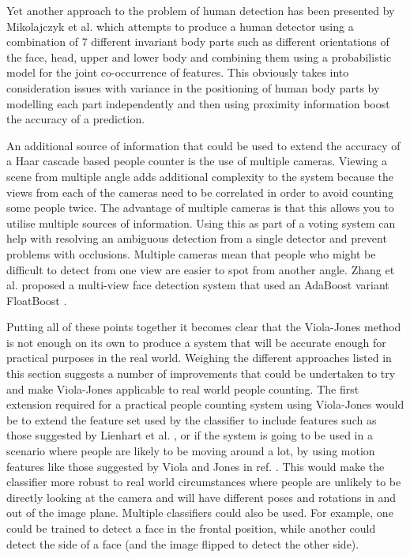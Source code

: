 \documentclass[conference]{IEEEtran}
\begin{document}
Yet another approach to the problem of human detection has been presented by Mikolajczyk et al. \cite{mikolajczyk2004human} which attempts to produce a human detector using a combination of 7 different invariant body parts such as different orientations of the face, head, upper and lower body and combining them using a probabilistic model for the joint co-occurrence of features. This obviously takes into consideration issues with variance in the positioning of human body parts by modelling each part independently and then using proximity information boost the accuracy of a prediction.

An additional source of information that could be used to extend the accuracy of a Haar cascade based people counter is the use of multiple cameras. Viewing a scene from multiple angle adds additional complexity to the system because the views from each of the cameras need to be correlated in order to avoid counting some people twice. The advantage of multiple cameras is that this allows you to utilise multiple sources of information. Using this as part of a voting system can help with resolving an ambiguous detection from a single detector and prevent problems with occlusions. Multiple cameras mean that people who might be difficult to detect from one view are easier to spot from another angle. Zhang et al. \cite{zhang2006robust} proposed a multi-view face detection system that used an AdaBoost variant FloatBoost \cite{li2004floatboost}.

Putting all of these points together it becomes clear that the Viola-Jones method is not enough on its own to produce a system that will be accurate enough for practical purposes in the real world. Weighing the different approaches listed in this section suggests a number of improvements that could be undertaken to try and make Viola-Jones applicable to real world people counting. The first extension required for a practical people counting system using Viola-Jones would be to extend the feature set used by the classifier to include features such as those suggested by Lienhart et al. \cite{lienhart2002extended}, or if the system is going to be used in a scenario where people are likely to be moving around a lot, by using motion features like those suggested by Viola and Jones in ref. \cite{viola2003detecting}. This would make the classifier more robust to real world circumstances where people are unlikely to be directly looking at the camera and will have different poses and rotations in and out of the image plane. Multiple classifiers could also be used. For example, one could be trained to detect a face in the frontal position, while another could detect the side of a face (and the image flipped to detect the other side). 
\end{document}
